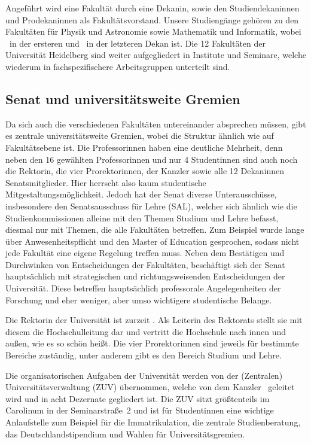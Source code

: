 Angeführt wird eine Fakultät durch eine Dekanin, sowie den Studiendekaninnen und Prodekaninnen als Fakultätsvorstand. Unsere Studiengänge gehören zu den Fakultäten für Physik und Astronomie sowie Mathematik und Informatik, wobei \dekanphysik\ in der ersteren und \dekanmathe\ in der letzteren Dekan ist. Die 12 Fakultäten der Universität Heidelberg sind weiter aufgegliedert in Institute und Seminare, welche wiederum in fachspezifischere Arbeitsgruppen unterteilt sind.

\subsection{Senat und universitätsweite Gremien}
Da sich auch die verschiedenen Fakultäten untereinander absprechen müssen, gibt es zentrale universitätsweite Gremien, wobei die Struktur ähnlich wie auf Fakultätsebene ist. Die Professorinnen haben eine deutliche Mehrheit, denn neben den 16 gewählten Professorinnen und nur 4 Studentinnen sind auch noch die Rektorin, die vier Prorektorinnen, der Kanzler sowie alle 12 Dekaninnen Senatsmitglieder. Hier herrscht also kaum studentische Mitgestaltungsmöglichkeit. Jedoch hat der Senat diverse Unterausschüsse, insbesondere den Senatsausschuss für Lehre (SAL), welcher sich ähnlich wie die Studienkommissionen alleine mit den Themen Studium und Lehre befasst, diesmal nur mit Themen, die alle Fakultäten betreffen. Zum Beispiel wurde lange über Anwesenheitspflicht und den Master of Ed\-u\-ca\-tion gesprochen, sodass nicht jede Fakultät eine eigene Regelung treffen muss. Neben dem Bestätigen und Durchwinken von Entscheidungen der Fakultäten, beschäftigt sich der Senat hauptsächlich mit strategischen und richtungsweisenden Entscheidungen der Universität.
Diese betreffen hauptsächlich professorale Angelegenheiten der Forschung und eher weniger, aber umso wichtigere studentische Belange.

Die Rektorin der Universität ist zurzeit \rektor. Als Leiterin des Rektorats stellt sie mit diesem die Hochschulleitung dar und vertritt die Hochschule nach innen und außen, wie es so schön heißt. Die vier Prorektorinnen sind jeweils für bestimmte Bereiche zuständig, unter anderem gibt es den Bereich Studium und Lehre.

Die organisatorischen Aufgaben der Universität werden von der (Zentralen) Universitätsverwaltung (ZUV) übernommen, welche von dem Kanzler \kanzler\ geleitet wird und in acht Dezernate gegliedert ist. Die ZUV sitzt größtenteils im Carolinum in der Seminarstraße~2 und ist für Studentinnen eine wichtige Anlaufstelle zum Beispiel für die Immatrikulation, die zentrale Studienberatung, das Deutschlandstipendium und Wahlen für Universitätsgremien.

